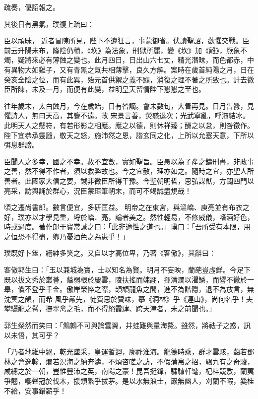 \begin{pinyinscope}
 疏奏，優詔報之。



 其後日有黑氣，璞復上疏曰：



 臣以頑昧，
 近者冒陳所見，陛下不遺狂言，事蒙御省。伏讀聖詔，歡懼交戰。臣前云升陽未布，隆陰仍積，《坎》為法象，刑獄所麗，變《坎》加《離》，厥象不燭，疑將來必有薄蝕之變也。此月四日，日出山六七丈，精光潛昧，而色都赤，中有異物大如雞子，又有青黑之氣共相薄擊，良久方解。案時在歲首純陽之月，日在癸亥全陰之位，而有此異，殆元首供禦之義不顯，消復之理不著之所致也。計去微臣所陳，未及一月，而便有此變，益明皇天留情陛下懇懇之至也。



 往年歲末，太白蝕月，今在歲始，日有咎謫。會未數旬，大眚再見。日月告釁，見懼詩人，無曰天高，其鑒不遠。故
 宋景言善，熒惑退次；光武寧亂，呼沲結冰。此明天人之懸符，有若形影之相應。應之以德，則休祥臻；酬之以怠，則咎徵作。陛下宜恭承靈譴，敬天之怒，施沛然之恩，諧玄同之化，上所以允塞天意，下所以弭息群謗。



 臣聞人之多幸，國之不幸。赦不宜數，實如聖旨。臣愚以為子產之鑄刑書，非政事之善，然不得不作者，須以救弊故也。今之宜赦，理亦如之。隨時之宜，亦聖人所善者。此國家大信之要，誠非微臣所得干豫。今聖朝明哲，思弘謀猷，方闢四門以亮采，訪輿誦於群心，況臣蒙珥筆朝末，而可不竭誠盡規哉！



 頃之遷尚書郎。數言便宜，多研匡益。
 明帝之在東宮，與溫嶠、庾亮並有布衣之好，璞亦以才學見重，埒於嶠、亮，論者美之。然性輕易，不修威儀，嗜酒好色，時或過度。著作郎干寶常誡之曰：「此非適性之道也。」璞曰：「吾所受有本限，用之恒恐不得盡，卿乃憂酒色之為患乎！」



 璞既好卜筮，縉紳多笑之。又自以才高位卑，乃著《客傲》，其辭曰：



 客傲郭生曰：「玉以兼城為寶，士以知名為賢。明月不妄映，蘭葩豈虛鮮。今足下既以拔文秀於叢薈，蔭弱根於慶雲，陵扶搖而竦翮，揮清瀾以濯鱗，而響不徹於一皋，價不登乎千金。傲岸榮悴之際，頡頏龍魚之間，進不為諧隱，退不為放言，無沈冥之韻，而希
 風乎嚴先，徒費思於贊味，摹《洞林》乎《連山》，尚何名乎！夫攀驪龍之髯，撫翠禽之毛，而不得絕霞肆、跨天津者，未之前聞也。」



 郭生粲然而笑曰：「鷦鷯不可與論雲翼，井蛙難與量海鰲。雖然，將祛子之惑，訊以未悟，其可乎？



 「乃者地維中絕，乾光墜采，皇運暫迴，廓祚淮海。龍德時乘，群才雲駭，藹若鄧林之會逸翰，爛若溟海之納奔濤，不煩咨嗟之訪，不假蒲帛之招，羈九有之奇駿，咸總之於一朝，豈惟豐沛之英，南陽之豪！昆吾挺鋒，驌驦軒髦，杞梓競敷，蘭荑爭翹，嚶聲冠於伐木，援類繁乎拔茅。是以水無浪士，巖無幽人，刈蘭不暇，爨桂不給，安事錯薪乎！




\end{pinyinscope}
